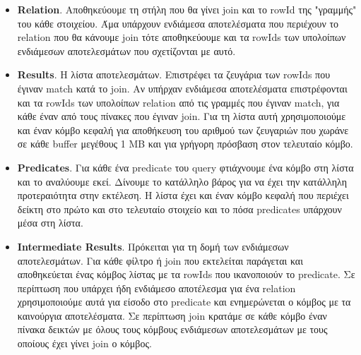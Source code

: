 \documentclass[12pt, a4paper]{article}
\begin{document}
\begin{itemize}
	\item \textbf{Relation}. Αποθηκεύουμε τη στήλη που θα γίνει join και το rowId της "γραμμής" του κάθε στοιχείου. Άμα υπάρχουν ενδιάμεσα αποτελέσματα που  περιέχουν το relation που θα κάνουμε join τότε αποθηκεύουμε και τα rowIds των υπολοίπων ενδιάμεσων αποτελεσμάτων που σχετίζονται με αυτό.
	\item \textbf{Results}. Η λίστα αποτελεσμάτων. Επιστρέφει τα ζευγάρια των rowIds που έγιναν match κατά το join. Αν υπήρχαν ενδιάμεσα αποτελέσματα επιστρέφονται και τα rowIds των υπολοίπων relation από τις γραμμές που έγιναν match, για κάθε έναν από τους πίνακες που έγιναν join. Για τη λίστα αυτή χρησιμοποιούμε και έναν κόμβο κεφαλή για αποθήκευση του αριθμού των ζευγαριών που χωράνε σε κάθε buffer μεγέθους 1 MB και για γρήγορη πρόσβαση στον τελευταίο κόμβο.
	\item \textbf{Predicates}. Για κάθε ένα predicate του query φτιάχνουμε ένα κόμβο στη λίστα και το αναλύουμε εκεί. Δίνουμε το κατάλληλο βάρος για να έχει την κατάλληλη προτεραιότητα στην εκτέλεση. Η λίστα έχει και έναν κόμβο κεφαλή που περιέχει δείκτη στο πρώτο και στο τελευταίο στοιχείο και το πόσα predicates  υπάρχουν μέσα στη λίστα.
	\item \textbf{Intermediate Results}. Πρόκειται για τη δομή των ενδιάμεσων αποτελεσμάτων. Για κάθε φίλτρο ή join που εκτελείται παράγεται και αποθηκεύεται  ένας κόμβος λίστας με τα rowIds που ικανοποιούν το predicate. Σε περίπτωση που υπάρχει ήδη ενδιάμεσο αποτέλεσμα για ένα relation χρησιμοποιούμε αυτά για είσοδο στο predicate και ενημερώνεται ο κόμβος με τα καινούργια αποτελέσματα. Σε περίπτωση join κρατάμε σε κάθε κόμβο έναν πίνακα δεικτών με όλους τους κόμβους ενδιάμεσων αποτελεσμάτων με τους οποίους έχει γίνει join ο κόμβος.
\end{itemize}
\end{document}

